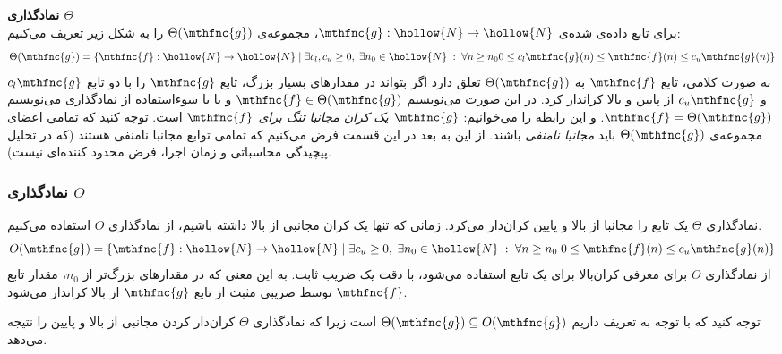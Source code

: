 
\textbf{
نمادگذاری
$\Theta$
}\\
برای تابع داده‌ی شده‌ی
$\mthfnc{g}: \hollow{N} \rightarrow \hollow{N}$،
مجموعه‌ی
$\Theta( \mthfnc{g} )$
را به شکل زیر تعریف می‌کنیم:
\[
\Theta( \mthfnc{g} ) = \left\lbrace \mthfnc{f}: \hollow{N} \rightarrow \hollow{N} \;\vert\; \exists c_l,c_u \geq 0, \; \exists n_0 \in \hollow{N} \; : \; \forall n \geq n_0 0 \leq c_l \mthfnc{g}(n) \leq \mthfnc{f}(n) \leq c_u \mthfnc{g}(n) \right\rbrace
\]
به صورت کلامی، تابع
$\mthfnc{f}$
به
$\Theta( \mthfnc{g} )$
تعلق دارد اگر بتواند در مقدارهای بسیار بزرگ، تابع
$\mthfnc{g}$
را با دو تابع
$c_l \mthfnc{g}$
و
$c_u \mthfnc{g}$
از پایین و بالا کراندار کرد. در این صورت می‌نویسیم
$\mthfnc{f} \in \Theta( \mthfnc{g} )$
و یا با سوءاستفاده از نمادگذاری می‌نویسیم
$\mthfnc{f} = \Theta( \mthfnc{g} )$.
و این رابطه را می‌خوانیم:
\textit{
$\mthfnc{g}$
یک کران مجانبا تنگ
 برای
$\mthfnc{f}$
}
است. توجه کنید که تمامی اعضای مجموعه‌ی
$\Theta( \mthfnc{g} )$
باید
\textit{
مجانبا نامنفی
}
باشند. از این به بعد در این قسمت فرض می‌کنیم که تمامی توابع مجانبا نامنفی هستند (که در تحلیل پیچیدگی محاسباتی
و زمان اجرا، فرض محدود کننده‌ای نیست).


\subsubsection{
نمادگذاری
$O$
}
نمادگذاری
$\Theta$
یک تابع را مجانبا از بالا و پایین کران‌دار می‌کرد. زمانی که تنها یک کران مجانبی از بالا داشته باشیم، از نمادگذاری
$O$
استفاده می‌کنیم.
\[
O( \mthfnc{g} ) = \left\lbrace \mthfnc{f}: \hollow{N} \rightarrow \hollow{N} \;\vert\; \exists c_u \geq 0, \; \exists n_0 \in \hollow{N} \; : \; \forall n \geq n_0 \; 0 \leq \mthfnc{f}(n) \leq c_u \mthfnc{g}(n) \right\rbrace
\]
از نمادگذاری
$O$
برای معرفی کران‌بالا برای یک تابع استفاده می‌شود، با دقت یک ضریب ثابت. به این معنی که در مقدارهای بزرگ‌تر از
$n_0$،
مقدار تابع
$\mthfnc{f}$
توسط ضریبی مثبت از تابع
$\mthfnc{g}$
از بالا کراندار می‌شود.


توجه کنید که با توجه به تعریف داریم
$\Theta( \mthfnc{g} ) \subseteq O( \mthfnc{g} )$
است زیرا که نمادگذاری
$\Theta$
کران‌دار کردن مجانبی از بالا و پایین را نتیجه می‌دهد.


